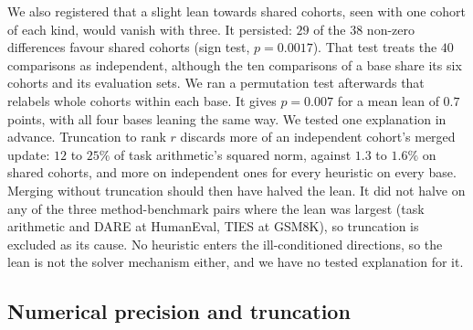 We also registered that a slight lean towards shared cohorts, seen with one
cohort of each kind, would vanish with three. It persisted: $29$ of the $38$ non-zero
differences favour shared cohorts (sign test, $p = 0.0017$). That test treats
the $40$ comparisons as independent, although the ten comparisons of a
base share its six
cohorts and its evaluation sets. We ran a permutation test afterwards that
relabels whole cohorts within each base. It gives $p = 0.007$ for a mean lean
of $0.7$ points, with all four bases leaning the same way. We tested one
explanation in advance. Truncation to rank $r$ discards more of an independent
cohort's merged update: $12$ to $25\%$ of task arithmetic's squared norm,
against $1.3$ to $1.6\%$ on shared cohorts, and more on independent ones for
every heuristic on every base. Merging without truncation should then have
halved the lean. It did not halve on any of the three method-benchmark pairs
where the lean was largest (task arithmetic and DARE at HumanEval, TIES at
GSM8K), so truncation is excluded as its cause. No heuristic enters the
ill-conditioned directions, so the lean is not the solver mechanism either,
and we have no tested explanation for it.

\subsection{Numerical precision and truncation}\label{app:precision}

